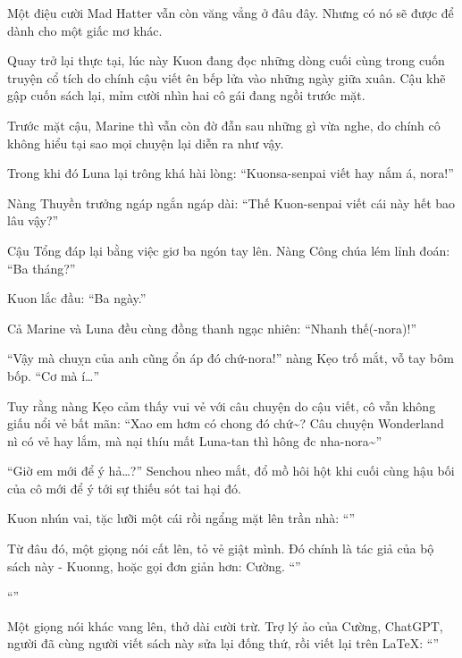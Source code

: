 \documentclass[../main.tex]{subfiles}
\begin{document}
Một điệu cười Mad Hatter vẫn còn văng vẳng ở đâu đây. Nhưng có nó sẽ được để dành cho một giấc mơ khác.

\omk

Quay trở lại thực tại, lúc này Kuon đang đọc những dòng cuối cùng trong cuốn truyện cổ tích do chính cậu viết ên bếp lửa vào những ngày giữa xuân. Cậu khẽ gập cuốn sách lại, mỉm cười nhìn hai cô gái đang ngồi trước mặt.

Trước mặt cậu, Marine thì vẫn còn đờ đẫn sau những gì vừa nghe, do chính cô không hiểu tại sao mọi chuyện lại diễn ra như vậy.

Trong khi đó Luna lại trông khá hài lòng: ``Kuonsa-senpai viết hay nắm á, nora!''

Nàng Thuyền trưởng ngáp ngắn ngáp dài: ``Thế Kuon-senpai viết cái này hết bao lâu vậy?''

Cậu Tổng đáp lại bằng việc giơ ba ngón tay lên. Nàng Công chúa lém lỉnh đoán: ``Ba tháng?''

Kuon lắc đầu: ``Ba ngày.''

Cả Marine và Luna đều cùng đồng thanh ngạc nhiên: ``Nhanh thế(-nora)!''

``Vậy mà chuỵn của anh cũng ổn áp đó chứ-nora!'' nàng Kẹo trố mắt, vỗ tay bôm bốp. ``Cơ mà í\dots''

Tuy rằng nàng Kẹo cảm thấy vui vẻ với câu chuyện do cậu viết, cô vẫn không giấu nổi vẻ bất mãn: ``Xao em hơm có chong đó chứ\~{}? Câu chuyện Wonderland nì có vẻ hay lắm, mà nại thíu mất Luna-tan thì hông đc nha-nora\~{}''

``Giờ em mới để ý hả\dots?'' Senchou nheo mắt, đổ mồ hôi hột khi cuối cùng hậu bối của cô mới để ý tới sự thiếu sót tai hại đó.

Kuon nhún vai, tặc lưỡi một cái rồi ngẩng mặt lên trần nhà: ``''

Từ đâu đó, một giọng nói cất lên, tỏ vẻ giật mình. Đó chính là tác giả của bộ sách này - Kuonng, hoặc gọi đơn giản hơn: Cường. ``''

``''

Một giọng nói khác vang lên, thở dài cười trừ. Trợ lý ảo của Cường, ChatGPT, người đã cùng người viết sách này sửa lại đống thứ, rồi viết lại trên \LaTeX : ``''
\end{document}
